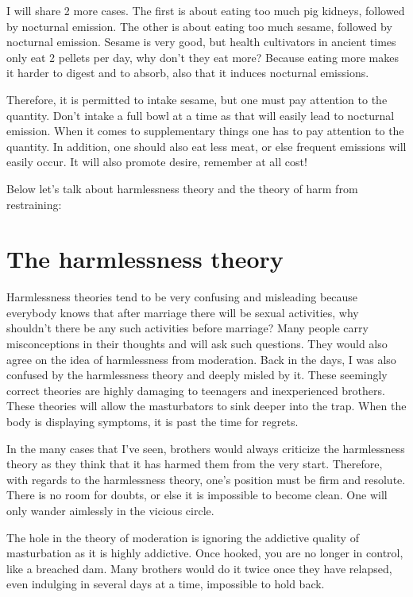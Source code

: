 \documentclass[
]{book}
\begin{document}
I will share 2 more cases. The first is about eating too much pig kidneys, followed by nocturnal emission. The other is about eating too much sesame, followed by nocturnal emission. Sesame is very good, but health cultivators in ancient times only eat 2 pellets per day, why don't they eat more? Because eating more makes it harder to digest and to absorb, also that it induces nocturnal emissions.

Therefore, it is permitted to intake sesame, but one must pay attention to the quantity. Don't intake a full bowl at a time as that will easily lead to nocturnal emission. When it comes to supplementary things one has to pay attention to the quantity. In addition, one should also eat less meat, or else frequent emissions will easily occur. It will also promote desire, remember at all cost!

Below let's talk about harmlessness theory and the theory of harm from restraining:

\hypertarget{the-harmlessness-theory}{%
\section{The harmlessness theory}\label{the-harmlessness-theory}}

Harmlessness theories tend to be very confusing and misleading because everybody knows that after marriage there will be sexual activities, why shouldn't there be any such activities before marriage? Many people carry misconceptions in their thoughts and will ask such questions. They would also agree on the idea of harmlessness from moderation. Back in the days, I was also confused by the harmlessness theory and deeply misled by it. These seemingly correct theories are highly damaging to teenagers and inexperienced brothers. These theories will allow the masturbators to sink deeper into the trap. When the body is displaying symptoms, it is past the time for regrets.

In the many cases that I've seen, brothers would always criticize the harmlessness theory as they think that it has harmed them from the very start. Therefore, with regards to the harmlessness theory, one's position must be firm and resolute. There is no room for doubts, or else it is impossible to become clean. One will only wander aimlessly in the vicious circle.

The hole in the theory of moderation is ignoring the addictive quality of masturbation as it is highly addictive. Once hooked, you are no longer in control, like a breached dam. Many brothers would do it twice once they have relapsed, even indulging in several days at a time, impossible to hold back.
\end{document}

